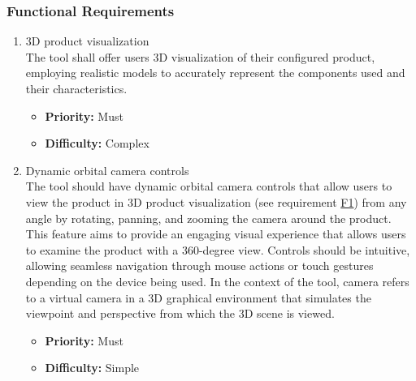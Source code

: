 \subsubsection{Functional Requirements}

\begin{enumerate}[label=\textbf{F\arabic*:}, leftmargin=*]
\item \label{itm:F1} 3D product visualization
\vspace{2pt}
\\The tool shall offer users 3D visualization of their configured product, employing realistic models to accurately represent the components used and their characteristics.
\begin{itemize}[noitemsep, label=\trianglebullet]
    \item \textbf{Priority:} Must
    \item \textbf{Difficulty:} Complex
\end{itemize}
\vspace{4pt}

\item \label{itm:F2} Dynamic orbital camera controls
\vspace{2pt}
\\The tool should have dynamic orbital camera controls that allow users to view the product in 3D product visualization (see requirement \hyperref[itm:F1]{F1}) from any angle by rotating, panning, and zooming the camera around the product. This feature aims to provide an engaging visual experience that allows users to examine the product with a 360-degree view. Controls should be intuitive, allowing seamless navigation through mouse actions or touch gestures depending on the device being used. In the context of the tool, camera refers to a virtual camera in a 3D graphical environment that simulates the viewpoint and perspective from which the 3D scene is viewed.
\begin{itemize}[noitemsep, label=\trianglebullet]
    \item \textbf{Priority:} Must
    \item \textbf{Difficulty:} Simple
\end{itemize}
\vspace{4pt}


\end{enumerate}
